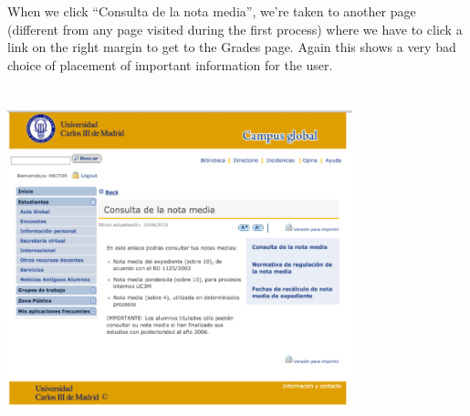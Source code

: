 \documentclass{article}
\begin{document}
When we click “Consulta de la nota media”, we’re taken to another page (different from any page visited during the first process) where we have to click a link on the right margin to get to the Grades page. Again this shows a very bad choice of placement of important information for the user.
\begin{center}
\includegraphics[width=10cm, height=10cm, keepaspectratio]{2}\vspace{0.3cm} \\
\end{center}
\end{document}
